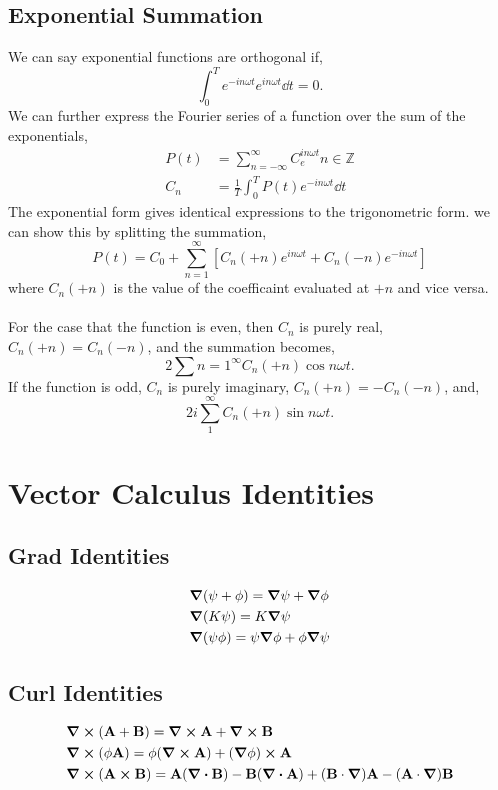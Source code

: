 \documentclass{book}
\begin{document}
\section{Exponential Summation}
We can say exponential functions are orthogonal if,
\begin{equation}
	\int_0^T e^{-in\omega t}e^{in\omega t}\dd{t} = 0.
\end{equation}
We can further express the Fourier series of a function over the sum of the exponentials,
\begin{align}
	P(t) & = \sum_{n=-\infty}^{\infty}C_e^{in\omega t} n \in \mathbb{Z} \\
	C_n & = \frac{1}{T} \int_0^TP(t)e^{-in\omega t}\dd{t} \label{C}
\end{align}
The exponential form gives identical expressions to the trigonometric form. we can show this by splitting the summation,
\begin{equation}
	P(t) = C_0 + \sum_{n=1}^{\infty}\left[C_n(+n)e^{in\omega t} + C_n(-n)e^{-in\omega t}\right]
\end{equation} 
where $C_n(+n)$ is the value of the coefficaint evaluated at $+n$ and vice versa. 
\\\\
For the case that the function is even, then $C_n$ is purely real, $C_n(+n) = C_n(-n)$, and the summation becomes,
\begin{equation}
	2\sum{n=1}^{\infty}C_n(+n)\cos{n\omega t}.
\end{equation}
If the function is odd, $C_n$ is purely imaginary, $C_n(+n) = -C_n(-n)$, and,
\begin{equation}
	2i\sum_1^{\infty}C_n(+n)\sin n\omega t.
\end{equation}
\appendix
 \chapter{Vector Calculus Identities}
\section{Grad Identities}
\begin{align}
    & \grad(\psi + \phi) = \grad\psi + \grad\phi \\
    & \grad(K\psi) = K\grad\psi \\
    & \grad(\psi\phi) = \psi\grad\phi + \phi\grad\psi 
\end{align}
\section{Curl Identities}
\begin{align}
    & \curl{(\vb{A}+\vb{B})} = \curl{\vb{A}} + \curl{\vb{B}} \\
    & \curl{(\phi\vb{A})} = \phi(\curl{\vb{A}})+(\grad\phi)\cross\vb{A} \\
    & \curl{(\vb{A}\cross\vb{B})} = \vb{A}(\div{\vb{B}})-\vb{B}(\div{\vb{A}})+(\vb{B}\cdot\grad)\vb{A}-(\vb{A}\cdot\grad)\vb{B}
\end{align}
\end{document}
